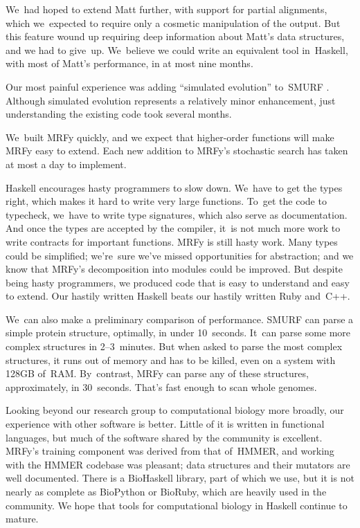 \documentclass[nonatbib,preprint,blockstyle,times]{sigplanconf}
\let\cite\citep
\begin{document}
We~had hoped to extend Matt further, with support for partial alignments,
which we~expected to require only 
a cosmetic manipulation of the 
output.
But
this feature wound up
requiring deep information about Matt's data structures,
and we had to give~up.
We~believe we could write an equivalent tool in~Haskell,
with most of Matt's performance, in at most nine months.

Our most painful experience was adding ``simulated evolution''
to~SMURF \cite{Daniels:2012}. 
Although simulated evolution represents a relatively minor
enhancement,
just understanding the existing code took several months.

We~built MRFy quickly, and we expect that
higher-order functions will make MRFy easy to extend.
Each new addition to MRFy's stochastic search has taken at most a day
to implement.

Haskell encourages hasty programmers to slow down.
We~have to get the types right,
which makes it hard to write very large functions.
To~get the code to typecheck, we~have to write type signatures, which
also serve as documentation.
And once the types are accepted by the compiler,
it~is not much more work to write contracts for important functions.
MRFy is still hasty work.
Many types could be simplified;
we're~sure we've missed opportunities for abstraction;
and we know that MRFy's decomposition into modules could be improved.
But despite being hasty programmers, we produced code 
that is easy to understand and easy to extend.
Our hastily written Haskell beats
our hastily written Ruby and~C++.

We~can also make a preliminary comparison of performance.
SMURF can parse a simple protein structure, optimally, in under 10~seconds.
It~can parse some more complex structures in 2--3~minutes.
But when asked to parse the most complex structures, it runs out of
memory and has to be killed, even on a system with 128GB of~RAM.
By~contrast, MRFy can parse any of these structures, approximately,
in 30~seconds.
That's fast enough
to scan whole genomes.




Looking beyond our research group to computational biology more
broadly, our experience with other software is better.
Little of it is written in functional languages, 
but much of the software shared by the community is excellent.
MRFy's training component was derived from that of~HMMER,
and
working with the HMMER 
codebase was pleasant;
data structures and their
mutators are well documented. 
There is a 
BioHaskell library, part of which we use,
but it is not nearly as 
complete as BioPython or BioRuby, which are heavily used in the community.
We hope that tools for computational biology in
Haskell continue to mature. 
\end{document}
